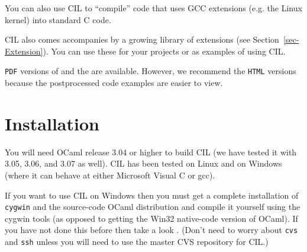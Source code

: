 \documentclass{article}
\def\secref#1{Section~\ref{sec-#1}}
\def\t#1{{\tt #1}}
\begin{document}
 You can also use CIL to ``compile'' code that uses GCC extensions (e.g. the
Linux kernel) into standard C code.

 CIL also comes accompanies by a growing library of extensions (see
\secref{Extension}). You can use these for your projects or as examples of
using CIL. 

\t{PDF} versions of  and the
 are available. However, we recommend the
\t{HTML} versions because the postprocessed code examples are easier to
view. 

\section{Installation}

You will need OCaml release 3.04 or higher to build CIL (we have
tested it with 3.05, 3.06, and 3.07 as well). CIL has been tested on
Linux and on Windows (where it can behave at either Microsoft Visual C
or gcc).

 If you want to use CIL on Windows then you must get a complete installation
of \t{cygwin} and the source-code OCaml distribution and compile it yourself
using the cygwin tools (as opposed to getting the Win32 native-code version of
OCaml). If you have not done this before then take a look
. (Don't need to worry about \t{cvs} and
\t{ssh} unless you will need to use the master CVS repository for CIL.)
\end{document}
